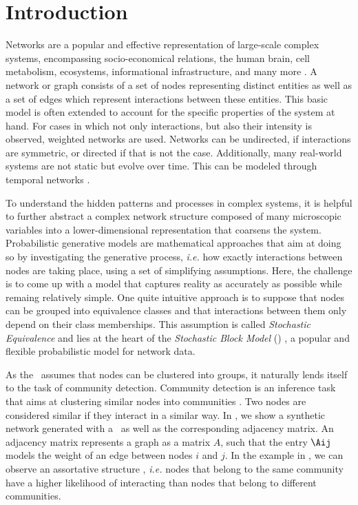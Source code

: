 \section{Introduction}

Networks are a popular and effective representation of large-scale complex systems, 
encompassing socio-economical relations, the human brain, cell metabolism,
ecosystems, informational infrastructure, and many more \cite{newman2018networks,newman2003structure}. 
A network or graph consists of a set of nodes representing distinct entities 
as well as a set of edges which represent interactions between these entities.
This basic model is often extended to account for the specific properties of the system at hand.
For cases in which not only interactions, but also their intensity is observed, weighted networks are used. 
Networks can be undirected, if interactions are symmetric, or directed if that is not the case.
Additionally, many real-world systems are not static but evolve over time.
This can be modeled through temporal networks \cite{masuda2016guide,holme2012temporal}.

To understand the hidden patterns and processes in complex systems, 
it is helpful to further abstract a complex network structure composed of many microscopic variables into a lower-dimensional representation that coarsens the system. 
Probabilistic generative models \cite{goldenberg2010survey} are mathematical approaches that aim at doing so by investigating the generative process, 
\textit{i.e.} how exactly interactions between nodes are taking place, using a set of simplifying assumptions.
Here, the challenge is to come up with a model that captures reality as accurately as possible 
while remaing relatively simple. 
One quite intuitive approach is to suppose that nodes can be grouped into equivalence classes and that interactions between them
only depend on their class memberships. This assumption is called \textit{Stochastic Equivalence} and lies at the heart of the
\textit{Stochastic Block Model} (\sbm) \cite{holland1983stochastic}, a popular and flexible probabilistic model for network data. 

As the \sbm\ assumes that nodes can be clustered into groups, it naturally lends itself to the task of community detection. 
Community detection is an inference task that aims at clustering similar nodes into communities 
\cite{fortunato2010community, javed2018community, lancichinetti2009community}. 
Two nodes are considered similar if they interact in a similar way.
In , we show a synthetic network generated with a \sbm\ as well as the corresponding adjacency matrix. 
An adjacency matrix represents a graph as a matrix $A$, such that the entry $\Aij$ models the weight of an edge between nodes $i$ and $j$.
In the example in , we can observe an assortative structure \cite{fortunato2016community}, 
\textit{i.e.} nodes that belong to the same community 
have a higher likelihood of interacting than nodes that belong to different communities. 

